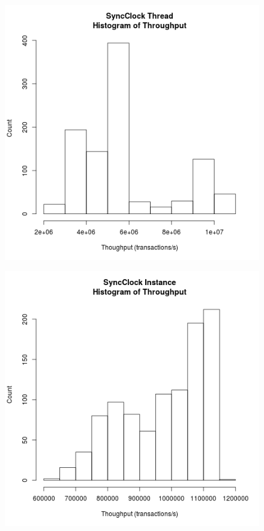 \begin{figure}
\center
\includegraphics[height=.4\textheight]{sync_thread_throughput_hist.png}
\caption{\label{sync_thread_throughput}}
\end{figure}

\begin{figure}
\center
\includegraphics[height=.4\textheight]{sync_instance_throughput_hist.png}
\caption{\label{sync_instance_throughput}}
\end{figure}

